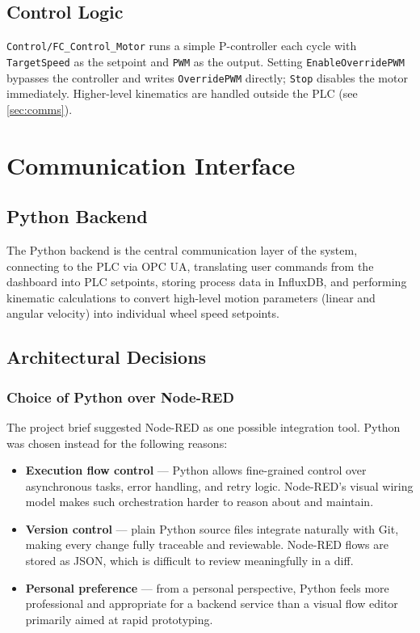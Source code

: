 \documentclass[a4paper,11pt]{article}
\newcommand{\fcControlMotor}{\texttt{Control/FC\_Control\_Motor}}
\newcommand{\fPWM}{\texttt{PWM}}
\newcommand{\fTargetSpeed}{\texttt{TargetSpeed}}
\newcommand{\fOverridePWM}{\texttt{OverridePWM}}
\newcommand{\fEnableOverridePWM}{\texttt{EnableOverridePWM}}
\newcommand{\fStop}{\texttt{Stop}}
\begin{document}
\subsection{Control Logic}

\fcControlMotor{} runs a simple P-controller each cycle with \fTargetSpeed{} as the setpoint and
\fPWM{} as the output. Setting \fEnableOverridePWM{}
bypasses the controller and writes \fOverridePWM{} directly; \fStop{} disables the motor
immediately. Higher-level kinematics are handled outside the PLC
(see \autoref{sec:comms}).

\section{Communication Interface}
\label{sec:comms}

\subsection{Python Backend}

The Python backend is the central communication layer of the system, connecting to the PLC via
OPC UA, translating user commands from the dashboard into PLC setpoints, storing process data in
InfluxDB, and performing kinematic calculations to convert high-level motion parameters (linear and
angular velocity) into individual wheel speed setpoints.

\subsection{Architectural Decisions}

\subsubsection{Choice of Python over Node-RED}

The project brief suggested Node-RED as one possible integration tool. Python was chosen instead
for the following reasons:

\begin{itemize}
    \item \textbf{Execution flow control} --- Python allows fine-grained control over asynchronous
    tasks, error handling, and retry logic. Node-RED's visual wiring model makes such orchestration
    harder to reason about and maintain.
    \item \textbf{Version control} --- plain Python source files integrate naturally with Git,
    making every change fully traceable and reviewable. Node-RED flows are stored as JSON, which is
    difficult to review meaningfully in a diff.
    \item \textbf{Personal preference} --- from a personal perspective, Python feels more
    professional and appropriate for a backend service than a visual flow editor primarily aimed
    at rapid prototyping.
\end{itemize}
\end{document}
